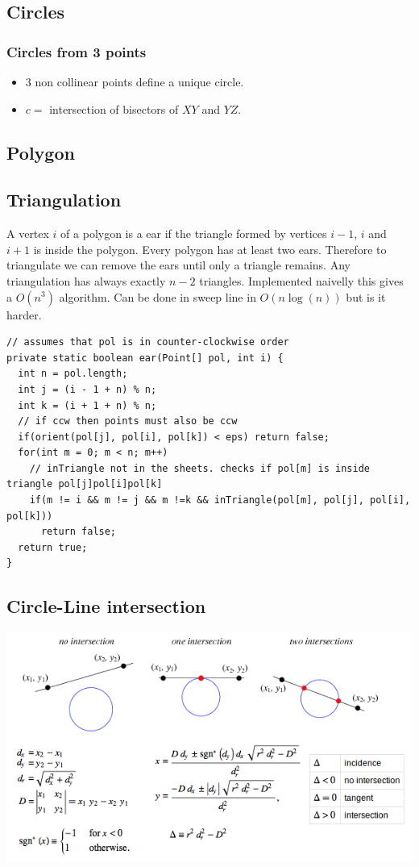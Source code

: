 \subsection{Circles}
\subsubsection{Circles from 3 points}
\begin{itemize}
\item $3$ non collinear points define a unique circle.
\item $c = $ intersection of bisectors of $XY$ and $YZ$. 
\end{itemize}
\subsection{Polygon}
\subsection{Triangulation}
A vertex $i$ of a polygon is a ear if the triangle formed by vertices
$i - 1$, $i$ and $i + 1$ is inside the polygon. Every polygon has at
least two ears. Therefore to triangulate we can remove the ears 
until only a triangle remains. Any triangulation has always exactly 
$n - 2$ triangles. Implemented naivelly this gives a $O(n^3)$ algorithm.
Can be done in sweep line in $O(n \log(n))$ but is it harder.
\begin{lstlisting}
// assumes that pol is in counter-clockwise order
private static boolean ear(Point[] pol, int i) {
  int n = pol.length;
  int j = (i - 1 + n) % n;
  int k = (i + 1 + n) % n;
  // if ccw then points must also be ccw
  if(orient(pol[j], pol[i], pol[k]) < eps) return false;
  for(int m = 0; m < n; m++)
    // inTriangle not in the sheets. checks if pol[m] is inside triangle pol[j]pol[i]pol[k]
    if(m != i && m != j && m !=k && inTriangle(pol[m], pol[j], pol[i], pol[k]))
      return false;
  return true;
}
\end{lstlisting}

\subsection{Circle-Line intersection}

\includegraphics[scale=0.5]{Geometrie/circleLine.png}

